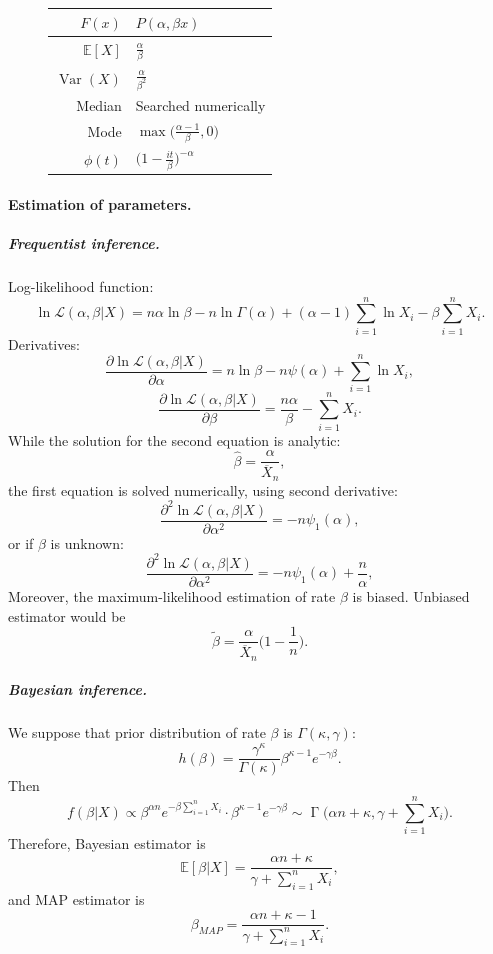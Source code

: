 \documentclass[a4paper,11pt]{article}
\theoremstyle{plain}
\theoremstyle{definition}
\newcommand{\ME}{\mathbb{E}}
\newcommand{\Var}{\operatorname{Var}}
\begin{document}
\begin{figure}[!htb]
\begin{minipage}{0.4\textwidth}
\begin{tabular}{| r | l |}
				$F(x)$ & $P(\alpha, \beta x) $\\
				\hline
				$\ME[X]$ & $ \frac{\alpha}{\beta}$ \\
				\hline
				$\Var(X)$ & $\frac{\alpha}{\beta^2}$ \\
				\hline
				Median & Searched numerically \\
				\hline
				Mode & $\max\big(\frac{\alpha - 1}{\beta}, 0\big)$ \\
				\hline
				$\phi(t)$ & $ \Big( 1-\frac{it}{\beta} \Big)^{-\alpha}$ \\
				\hline
			\end{tabular}
		\end{minipage}
	\end{figure}
	
	\paragraph{Estimation of parameters.}
	\subparagraph{Frequentist inference.} Log-likelihood function:
	\[
	\ln \mathcal{L}(\alpha, \beta|X) =  n \alpha \ln \beta - n \ln \Gamma(\alpha) + (\alpha - 1) \sum_{i=1}^{n} \ln X_i - \beta \sum_{i=1}^{n} X_i.
	\]
	Derivatives:
	\[
	\frac{\partial \ln \mathcal{L}(\alpha, \beta | X) }{\partial \alpha} = n \ln \beta - n \psi (\alpha) + \sum_{i=1}^{n} \ln X_i,
	\]
	\[
	\frac{\partial \ln \mathcal{L}(\alpha, \beta | X) }{\partial \beta} = \frac{n \alpha}{\beta} - \sum_{i=1}^{n} X_i.
	\]
	While the solution for the second equation is analytic:
	\[
	\hat{\beta} = \frac{\alpha}{\overline{X}_n},
	\]
	the first equation is solved numerically, using second derivative:
	\[
	\frac{\partial^2 \ln \mathcal{L}(\alpha, \beta | X) }{\partial \alpha^2} = - n \psi_1 (\alpha),
	\]
	or if $\beta$ is unknown:
	\[
	\frac{\partial^2 \ln \mathcal{L}(\alpha, \beta | X) }{\partial \alpha^2} = - n \psi_1 (\alpha) + \frac{n}{\alpha},
	\]
	Moreover, the maximum-likelihood estimation of rate $\beta$ is biased. Unbiased estimator would be
	\[
	\tilde{\beta} = \frac{\alpha}{\overline{X}_n} \Big(1 - \frac{1}{n}\Big).
	\]
	\subparagraph{Bayesian inference.} We suppose that prior distribution of rate $\beta$ is $\Gamma(\kappa, \gamma)$:
	\[
	h(\beta) = \frac{\gamma^\kappa}{\Gamma(\kappa)} \beta^{\kappa-1}e^{-\gamma \beta}.
	\]
	Then
	\[
	f(\beta | X) \propto \beta^{\alpha n} e^{-\beta \sum_{i=1}^{n} X_i } \cdot \beta^{\kappa-1}e^{-\gamma \beta} \sim \operatorname{\Gamma}\Big(\alpha n + \kappa, \gamma +\sum_{i=1}^{n} X_i \Big).
	\]
	Therefore, Bayesian estimator is
	\[
	\ME[\beta|X] = \frac{\alpha n + \kappa}{\gamma +\sum_{i=1}^{n} X_i},
	\]
	and MAP estimator is
	\[
	\beta_{MAP} = \frac{\alpha n + \kappa - 1}{\gamma +\sum_{i=1}^{n} X_i}.
	\]
	
\end{document}
